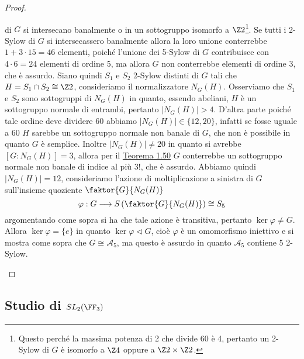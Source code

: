 \documentclass[11pt]{scrartcl}
\begin{document}
\begin{proof}
\begin{itemize}
        di $G$ si intersecano banalmente 
        o in un sottogruppo isomorfo a $\Z2$\footnote{
            Questo perché la massima potenza di 2 che divide 60 è 4, pertanto
            un 2-Sylow di $G$ è isomorfo a $\Z4$ oppure a $\Z2\times \Z2$.
        }. Se tutti i 2-Sylow di $G$ si intersecassero banalmente allora la 
        loro unione conterrebbe $1 + 3\cdot 15 = 46$ elementi, poiché l'unione dei
        5-Sylow di $G$ contribuisce con $4\cdot 6 = 24$ elementi di ordine 5,
        ma allora $G$ non conterrebbe elementi di ordine 3, che è assurdo.
        Siano quindi $S_1$ e $S_2$ 2-Sylow distinti di $G$ tali che 
        $H = S_1\cap S_2 \cong \Z2$, consideriamo il normalizzatore $N_G(H)$.
        Osserviamo che $S_1$ e $S_2$ sono sottogruppi di $N_G(H)$ in quanto, essendo
        abeliani, $H$ è un sottogruppo normale di entrambi, pertanto $|N_G(H)| > 4$.
        D'altra parte poiché tale ordine deve dividere 60 abbiamo 
        $|N_G(H)| \in \{12, 20\}$, infatti se fosse uguale a 60 $H$ sarebbe un 
        sottogruppo normale non banale di $G$, che non è possibile in quanto $G$
        è semplice. Inoltre $|N_G(H)| \neq 20$ in quanto si avrebbe $[G:N_G(H)] = 3$,
        allora per il \hyperref[teorema1.50]{Teorema 1.50} $G$ conterrebbe
        un sottogruppo normale non banale di indice al più $3!$, che è assurdo.
        Abbiamo quindi $|N_G(H)| = 12$, consideriamo l'azione di 
        moltiplicazione a sinistra di $G$ sull'insieme quoziente $\faktor{G}{N_G(H)}$
        \[
            \varphi : G\longrightarrow S\left(\faktor{G}{N_G(H)}\right)\cong S_5
        \]
        argomentando come sopra si ha che tale azione è transitiva, pertanto
        $\ker\varphi \neq G$. Allora $\ker\varphi = \{e\}$ in quanto 
        $\ker\varphi\triangleleft G$, cioè $\varphi$ è un omomorfismo iniettivo
        e si mostra come sopra che $G \cong \mathcal{A}_5$, ma questo è assurdo 
        in quanto $\mathcal{A}_5$ contiene 5 2-Sylow.
    \end{itemize}
\end{proof}

\newpage

\subsection{Studio di $SL_2(\FF_3)$}
\end{document}
